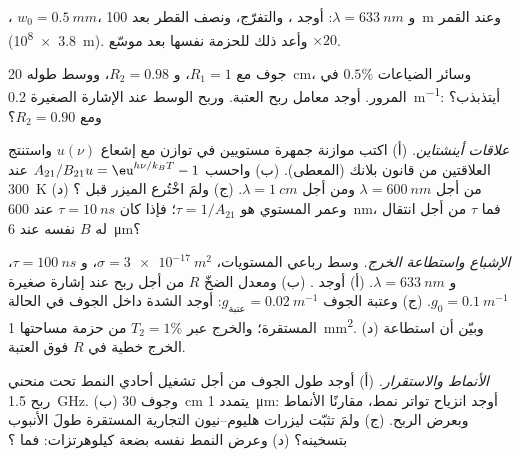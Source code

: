 \begin{exercise}[$\star$]\label{exo:b2:laser:3}
، $w_0 = \qty{0.5}{mm}$، و $\lambda = \qty{633}{nm}$: أوجد ، والتفرّج، ونصف القطر بعد \qty{100}{m} وعند القمر
(\qty{3.8e8}{m}). وأعد ذلك للحزمة نفسها بعد موسّع $\times 20$.
\end{exercise}

\begin{exercise}[$\star$]\label{exo:b2:laser:4}
جوف مع $R_1 = 1$، و $R_2 = 0.98$، ووسط طوله \qty{20}{cm}، وسائر
الضياعات $0.5\%$ في المرور. أوجد معامل ربح العتبة. وربح الوسط
عند الإشارة الصغيرة \qty{0.2}{m^{-1}}: أيتذبذب؟ ومع
$R_2 = 0.90$؟
\end{exercise}

\begin{exercise}[$\star\star$]\label{exo:b2:laser:5}
\emph{علاقات أينشتاين.} (أ) اكتب موازنة جمهرة
مستويين في توازن مع إشعاع $u(\nu)$ واستنتج العلاقتين
من قانون بلانك (المعطى). (ب) واحسب
$A_{21}/B_{21}u = \eu^{h\nu/k_BT} - 1$ عند \qty{300}{K} من أجل
$\lambda = \qty{600}{nm}$ ومن أجل $\lambda = \qty{1}{cm}$. (ج) ولمَ اخْتُرع
الميزر قبل ؟ (د) وعمر المستوي هو
$\tau = 1/A_{21}$؛ فإذا كان $\tau = \qty{10}{ns}$ عند \qty{600}{nm}، فما
$\tau$ من أجل انتقال له $B$ نفسه عند \qty{6}{\micro m}؟
\end{exercise}

\begin{exercise}[$\star\star$]\label{exo:b2:laser:6}
\emph{الإشباع واستطاعة الخرج.} وسط رباعي المستويات، $\sigma =
\qty{3e-17}{m^2}$، و $\tau = \qty{100}{ns}$، و $\lambda = \qty{633}{nm}$.
(أ) أوجد . (ب) ومعدل الضخّ $R$ من أجل ربح عند إشارة صغيرة
$g_0 = \qty{0.1}{m^{-1}}$. (ج) وعتبة الجوف
$g_{\text{عتبة}} = \qty{0.02}{m^{-1}}$: أوجد الشدة داخل الجوف في الحالة
المستقرة؛ والخرج عبر $T_2 = 1\%$ من حزمة مساحتها \qty{1}{mm^2}.
(د) وبيّن أن استطاعة الخرج خطية في $R$ فوق العتبة.
\end{exercise}

\begin{exercise}[$\star\star$]\label{exo:b2:laser:7}
\emph{الأنماط والاستقرار.} (أ) أوجد طول الجوف من أجل تشغيل أحادي النمط
تحت منحني ربح \qty{1.5}{GHz}. (ب) وجوف \qty{30}{cm} يتمدد
\qty{1}{\micro m}: أوجد انزياح تواتر نمط، مقارنًا 
الأنماط وبعرض الربح. (ج) ولمَ تثبّت ليزرات هليوم--نيون
التجارية المستقرة طولَ الأنبوب بتسخينه؟ (د) وعرض النمط نفسه
بضعة كيلوهرتزات: فما ؟
\end{exercise}

